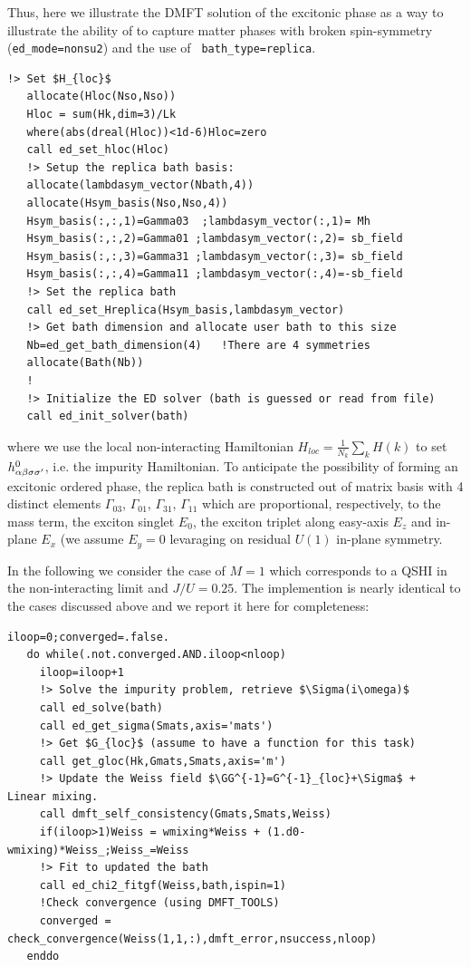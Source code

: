 \documentclass[edipack2.tex]{subfiles}
\begin{document}
Thus, here we illustrate the DMFT solution of the excitonic phase as a way to
illustrate the ability of \NAME to capture matter phases with broken
spin-symmetry ({\tt ed\_mode=nonsu2}) and the use of {\tt
  bath\_type=replica}.
\begin{lstlisting}[style=fstyle,numbers=none,basicstyle={\scriptsize\ttfamily}]
   !> Set $H_{loc}$
   allocate(Hloc(Nso,Nso))
   Hloc = sum(Hk,dim=3)/Lk
   where(abs(dreal(Hloc))<1d-6)Hloc=zero
   call ed_set_hloc(Hloc)
   !> Setup the replica bath basis:
   allocate(lambdasym_vector(Nbath,4))
   allocate(Hsym_basis(Nso,Nso,4))
   Hsym_basis(:,:,1)=Gamma03  ;lambdasym_vector(:,1)= Mh
   Hsym_basis(:,:,2)=Gamma01 ;lambdasym_vector(:,2)= sb_field
   Hsym_basis(:,:,3)=Gamma31 ;lambdasym_vector(:,3)= sb_field
   Hsym_basis(:,:,4)=Gamma11 ;lambdasym_vector(:,4)=-sb_field
   !> Set the replica bath
   call ed_set_Hreplica(Hsym_basis,lambdasym_vector)
   !> Get bath dimension and allocate user bath to this size
   Nb=ed_get_bath_dimension(4)   !There are 4 symmetries
   allocate(Bath(Nb))
   !
   !> Initialize the ED solver (bath is guessed or read from file) 
   call ed_init_solver(bath)
\end{lstlisting}
where we use the local non-interacting Hamiltonian 
$H_{loc}=\tfrac{1}{N_k}\sum_k H(k)$ to set 
$h^0_{\alpha\beta\sigma\sigma'}$, i.e. the impurity Hamiltonian. To anticipate the
possibility of forming an excitonic ordered phase, the replica bath
is constructed out of matrix basis with 4 distinct elements
$\Gamma_{03}$, $\Gamma_{01}$, $\Gamma_{31}$, $\Gamma_{11}$ which
are proportional, respectively, to the mass term, the exciton singlet
$E_0$, the exciton triplet along easy-axis $E_z$ and in-plane
$E_x$ (we assume $E_y=0$ levaraging on residual $U(1)$ in-plane
symmetry. 




In the following we consider the case of $M=1$ which corresponds to a
QSHI in the non-interacting limit and $J/U=0.25$.
The implemention is nearly identical to the cases discussed above and
we report it here for completeness:
\begin{lstlisting}[style=fstyle,numbers=none,basicstyle={\scriptsize\ttfamily}]
   iloop=0;converged=.false.
   do while(.not.converged.AND.iloop<nloop)
     iloop=iloop+1
     !> Solve the impurity problem, retrieve $\Sigma(i\omega)$
     call ed_solve(bath)
     call ed_get_sigma(Smats,axis='mats')
     !> Get $G_{loc}$ (assume to have a function for this task)
     call get_gloc(Hk,Gmats,Smats,axis='m')
     !> Update the Weiss field $\GG^{-1}=G^{-1}_{loc}+\Sigma$ +  Linear mixing.
     call dmft_self_consistency(Gmats,Smats,Weiss)
     if(iloop>1)Weiss = wmixing*Weiss + (1.d0-wmixing)*Weiss_;Weiss_=Weiss
     !> Fit to updated the bath
     call ed_chi2_fitgf(Weiss,bath,ispin=1)
     !Check convergence (using DMFT_TOOLS)
     converged = check_convergence(Weiss(1,1,:),dmft_error,nsuccess,nloop)
   enddo  
\end{lstlisting}
\end{document}
